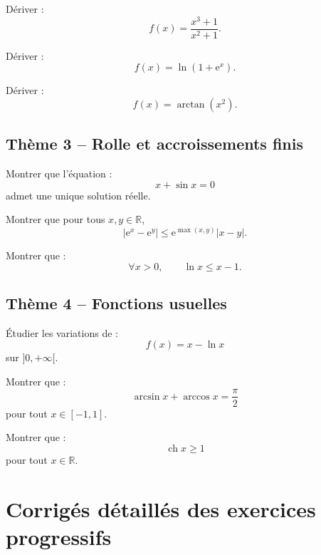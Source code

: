 \documentclass[11pt,a4paper]{article}
\newcommand{\R}{\mathbb R}
\newcommand{\e}{\mathrm e}
\newcommand{\ch}{\operatorname{ch}}
\begin{document}
\begin{exercicebox}[4]
Dériver :
\[
f(x)=\frac{x^3+1}{x^2+1}.
\]
\end{exercicebox}

\begin{exercicebox}[5]
Dériver :
\[
f(x)=\ln(1+\e^x).
\]
\end{exercicebox}

\begin{exercicebox}[6]
Dériver :
\[
f(x)=\arctan(x^2).
\]
\end{exercicebox}

\subsection*{Thème 3 -- Rolle et accroissements finis}

\begin{exercicebox}[7]
Montrer que l'équation :
\[
x+\sin x=0
\]
admet une unique solution réelle.
\end{exercicebox}

\begin{exercicebox}[8]
Montrer que pour tous \(x,y\in\R\),
\[
|\e^x-\e^y|\leq \e^{\max(x,y)}|x-y|.
\]
\end{exercicebox}

\begin{exercicebox}[9]
Montrer que :
\[
\forall x>0,\qquad \ln x\leq x-1.
\]
\end{exercicebox}

\subsection*{Thème 4 -- Fonctions usuelles}

\begin{exercicebox}[10]
Étudier les variations de :
\[
f(x)=x-\ln x
\]
sur \(]0,+\infty[\).
\end{exercicebox}

\begin{exercicebox}[11]
Montrer que :
\[
\arcsin x+\arccos x=\frac{\pi}{2}
\]
pour tout \(x\in[-1,1]\).
\end{exercicebox}

\begin{exercicebox}[12]
Montrer que :
\[
\ch x\geq1
\]
pour tout \(x\in\R\).
\end{exercicebox}

\newpage
\section{Corrigés détaillés des exercices progressifs}
\end{document}
